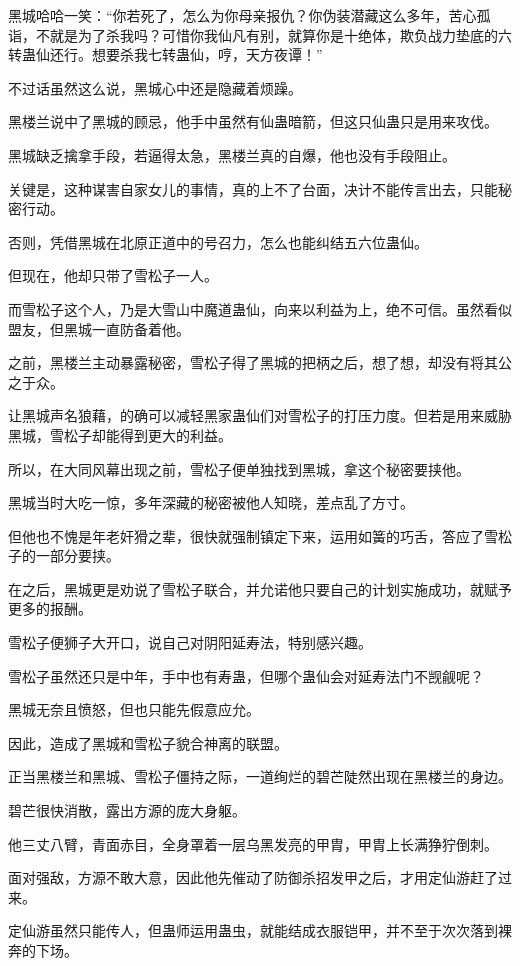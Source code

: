 \begin{this_body}
黑城哈哈一笑：“你若死了，怎么为你母亲报仇？你伪装潜藏这么多年，苦心孤诣，不就是为了杀我吗？可惜你我仙凡有别，就算你是十绝体，欺负战力垫底的六转蛊仙还行。想要杀我七转蛊仙，哼，天方夜谭！”

不过话虽然这么说，黑城心中还是隐藏着烦躁。

黑楼兰说中了黑城的顾忌，他手中虽然有仙蛊暗箭，但这只仙蛊只是用来攻伐。

黑城缺乏擒拿手段，若逼得太急，黑楼兰真的自爆，他也没有手段阻止。

关键是，这种谋害自家女儿的事情，真的上不了台面，决计不能传言出去，只能秘密行动。

否则，凭借黑城在北原正道中的号召力，怎么也能纠结五六位蛊仙。

但现在，他却只带了雪松子一人。

而雪松子这个人，乃是大雪山中魔道蛊仙，向来以利益为上，绝不可信。虽然看似盟友，但黑城一直防备着他。

之前，黑楼兰主动暴露秘密，雪松子得了黑城的把柄之后，想了想，却没有将其公之于众。

让黑城声名狼藉，的确可以减轻黑家蛊仙们对雪松子的打压力度。但若是用来威胁黑城，雪松子却能得到更大的利益。

所以，在大同风幕出现之前，雪松子便单独找到黑城，拿这个秘密要挟他。

黑城当时大吃一惊，多年深藏的秘密被他人知晓，差点乱了方寸。

但他也不愧是年老奸猾之辈，很快就强制镇定下来，运用如簧的巧舌，答应了雪松子的一部分要挟。

在之后，黑城更是劝说了雪松子联合，并允诺他只要自己的计划实施成功，就赋予更多的报酬。

雪松子便狮子大开口，说自己对阴阳延寿法，特别感兴趣。

雪松子虽然还只是中年，手中也有寿蛊，但哪个蛊仙会对延寿法门不觊觎呢？

黑城无奈且愤怒，但也只能先假意应允。

因此，造成了黑城和雪松子貌合神离的联盟。

正当黑楼兰和黑城、雪松子僵持之际，一道绚烂的碧芒陡然出现在黑楼兰的身边。

碧芒很快消散，露出方源的庞大身躯。

他三丈八臂，青面赤目，全身罩着一层乌黑发亮的甲胄，甲胄上长满狰狞倒刺。

面对强敌，方源不敢大意，因此他先催动了防御杀招发甲之后，才用定仙游赶了过来。

定仙游虽然只能传人，但蛊师运用蛊虫，就能结成衣服铠甲，并不至于次次落到裸奔的下场。


\end{this_body}
